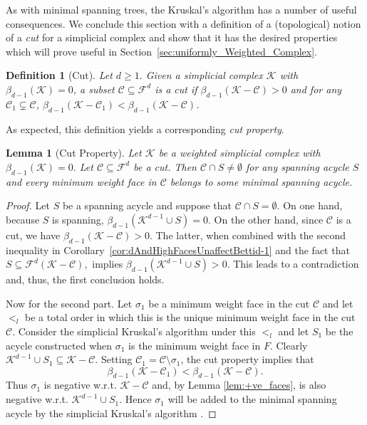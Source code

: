 \documentclass[12pt]{amsart}
\newcommand{\dy}[1]{\textcolor{magenta}{#1}}
\newcommand{\gt}[1]{\textcolor{blue}{#1}}
\newcommand{\remove}[1]{}
\renewcommand{\dy}[1]{#1}
\renewcommand{\gt}[1]{#1}
\newtheorem{lemma}[theorem]{Lemma}
\newtheorem{definition}[theorem]{Definition}
\numberwithin{equation}{section}
\numberwithin{theorem}{section}
\newcommand{\1}{\mathbf{1}}
\def\sC{\mathscr{C}}
\def\F{\mathcal{F}}
\def\K{\mathcal{K}}
\begin{document}
As with minimal spanning trees, the Kruskal's algorithm has a number of useful consequences. We conclude this section with a definition of a (topological) notion of a {\em cut} for a simplicial complex and show that it has the desired properties which will prove \dy{useful in Section~\ref{sec:uniformly_Weighted_Complex}.}
%
\begin{definition}[Cut]
Let $d \geq 1.$ Given a simplicial complex $\K$ with $\beta_{d-1}(\K) = 0$, a subset $\sC \subseteq \F^d$ is a cut if $\beta_{d-1}(\K - \sC) > 0$ and for any $\sC_1 \subsetneq \sC$, $\beta_{d-1}(\K - \sC_1) < \beta_{d-1}(\K - \sC)$.
\end{definition}
%
As expected, this definition yields a corresponding \emph{cut property}. 
\begin{lemma}[Cut Property]
\label{lem:cut}
Let $\K$ be a weighted simplicial complex with $\beta_{d-1}(\K) =0.$ Let $\sC \subseteq \F^d$ be a cut. Then $\sC \cap S \neq \emptyset$ for any spanning acycle $S$ and every minimum weight face in $\sC$ belongs to some minimal spanning acycle.
\end{lemma}

\begin{proof}
%
\gt{Let $S$ be a spanning acycle and suppose that $\sC \cap S = \emptyset.$ On one hand, because $S$ is spanning, $\beta_{d - 1}(\K^{d - 1} \cup S) = 0.$ On the other hand, since $\sC$ is a cut, we have $\beta_{d - 1}(\K - \sC) > 0.$ The latter, when combined with the second inequality in Corollary~\ref{cor:dAndHighFacesUnaffectBettid-1} and the fact that $S \subseteq \F^{d}(\K - \sC),$ implies $\beta_{d - 1}(\K^{d - 1} \cup S) > 0.$ This leads to a contradiction and, thus, the first conclusion holds.} 

\remove{The first conclusion follows from the definition of a cut and Lemma \ref{lem:ExistNegFace}.}

Now for the second part. Let $\sigma_1$ be a minimum weight face in the cut $\sC$ and let $<_l$ be a total order in which this is the unique minimum weight face in the cut $\sC$. Consider the simplicial Kruskal's algorithm under this $<_l$ and let $S_1$ be the acycle constructed when $\sigma_1$ is the minimum weight face in $F$. Clearly $\K^{d-1} \cup S_1 \subseteq \K - \sC$. Setting $\sC_1 = \sC \setminus \sigma_1$, the cut property implies that
%
$$ \beta_{d-1}(\K - \sC_1) < \beta_{d-1}(\K - \sC).$$
%
Thus $\sigma_1$ is negative w.r.t. $\K - \sC$ and, by Lemma \ref{lem:+ve_faces},
is also negative w.r.t. $\K^{d-1} \cup S_1.$ Hence $\sigma_1$ will be added to the minimal spanning acycle by the simplicial Kruskal's algorithm .
\end{proof}
\end{document}
